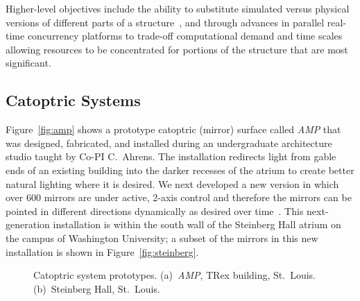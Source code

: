 Higher-level objectives include the ability to substitute simulated versus physical versions
of different parts of a structure~\cite{Huang10}, and through advances in
parallel real-time concurrency platforms to trade-off computational demand and
time scales~\cite{Ferry14} allowing resources to be concentrated for portions of
the structure that are most significant.



\subsection{Catoptric Systems}

Figure~\ref{fig:amp} shows a prototype catoptric (mirror) surface
called \emph{AMP} that was
designed, fabricated, and installed during an undergraduate architecture studio
taught by Co-PI C.~Ahrens. The installation redirects light from gable ends of an
existing building into the darker recesses of the atrium
to create better natural lighting where it is desired.
We next developed a
new version in which over 600 mirrors are under
active, 2-axis control and therefore the mirrors
can be pointed in different directions dynamically as desired over
time~\cite{acmbg19,acmb18,cagm18}.
This next-generation installation is within
the south wall of the Steinberg Hall atrium on the campus of
Washington University; a subset of the mirrors in this new
installation is shown in Figure~\ref{fig:steinberg}.

\begin{figure}[ht]
\centering
{}
\quad %
{}
\caption{Catoptric system prototypes.
(a)~\emph{AMP}, TRex building, St.~Louis.
(b)~Steinberg Hall, St.~Louis.
}
\label{fig:proto}
\end{figure}


